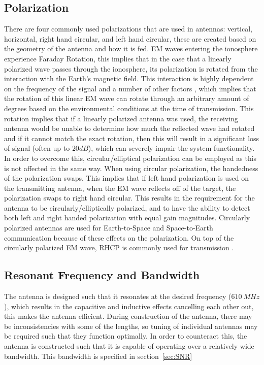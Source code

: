 \documentclass[11pt]{witseiepaper}
\begin{document}
\begin{bibunit}[witseie]
\subsection{Polarization} \label{sec:Polarization}
There are four commonly used polarizations that are used in antennas: vertical, horizontal, right hand circular, and left hand circular, these are created based on the geometry of the antenna and how it is fed.
EM waves entering the ionosphere experience Faraday Rotation, this implies that in the case that a linearly polarized wave passes through the ionosphere, its polarization is rotated from the interaction with the Earth's magnetic field. This interaction is highly dependent on the frequency of the signal and a number of other factors \cite[p.~24]{faradayRotationSlides}, which implies that the rotation of this linear EM wave can rotate through an arbitrary amount of degrees based on the environmental conditions at the time of transmission. This rotation implies that if a linearly polarized antenna was used, the receiving antenna would be unable to determine how much the reflected wave had rotated and if it cannot match the exact rotation, then this will result in a significant loss of signal (often up to $20 dB$), which can severely impair the system functionality.
In order to overcome this, circular/elliptical polarization can be employed as this is not affected in the same way.
When using circular polarization, the handedness of the polarization swaps. This implies that if left hand polarization is used on the transmitting antenna, when the EM wave reflects off of the target, the polarization swaps to right hand circular.
This results in the requirement for the antenna to be circularly/elliptically polarized, and to have the ability to detect both left and right handed polarization with equal gain magnitudes.
Circularly polarized antennas are used for Earth-to-Space and Space-to-Earth communication because of these effects on the polarization. On top of the circularly polarized EM wave, RHCP is commonly used for transmission \cite[p.~31]{crossedDipoleDesign}.

\subsection{Resonant Frequency and Bandwidth} \label{sec:ResonantFrequencyandBandwidth}
The antenna is designed such that it resonates at the desired frequency ($610~MHz$), which results in the capacitive and inductive effects cancelling each other out, this makes the antenna efficient. During construction of the antenna, there may be inconsistencies with some of the lengths, so tuning of individual antennas may be required such that they function optimally. In order to counteract this, the antenna is constructed such that it is capable of operating over a relatively wide bandwidth. This bandwidth is specified in section~\ref{sec:SNR}


\end{bibunit}
\end{document}
